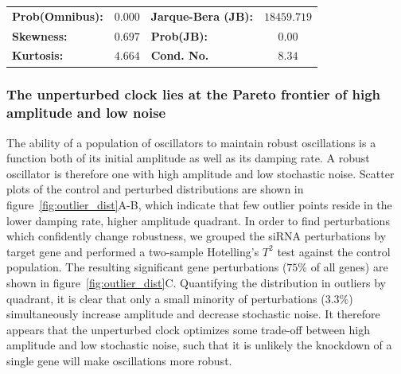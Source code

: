 \begin{table}
\begin{center}
\begin{tabular}{lclc}
\textbf{Prob(Omnibus):} &$  0.000 $& \textbf{  Jarque-Bera (JB):  } &$18459.719$ \\
\textbf{Skewness:}          &$  0.697 $& \textbf{  Prob(JB):          } &$     0.00$ \\
\textbf{Kurtosis:}      &$  4.664 $& \textbf{  Cond. No.          } &$     8.34$ \\
\bottomrule
\end{tabular}
\end{center} 
\label{tab:ols_reg}
\end{table}



\subsubsection{The unperturbed clock lies at the Pareto frontier of high amplitude and low noise}

The ability of a population of oscillators to maintain robust oscillations is a function both of its initial amplitude as well as its damping rate.
A robust oscillator is therefore one with high amplitude and low stochastic noise.
Scatter plots of the control and perturbed distributions are shown in figure~\ref{fig:outlier_dist}A-B, which indicate that few outlier points reside in the lower damping rate, higher amplitude quadrant.
In order to find perturbations which confidently change robustness, we grouped the siRNA perturbations by target gene and performed a two-sample Hotelling's $T^2$ test against the control population.
The resulting significant gene perturbations ($75\%$ of all genes) are shown in figure~\ref{fig:outlier_dist}C.
Quantifying the distribution in outliers by quadrant, it is clear that only a small minority of perturbations ($3.3\%$) simultaneously increase amplitude and decrease stochastic noise.
It therefore appears that the unperturbed clock optimizes some trade-off between high amplitude and low stochastic noise, such that it is unlikely the knockdown of a single gene will make oscillations more robust. 

